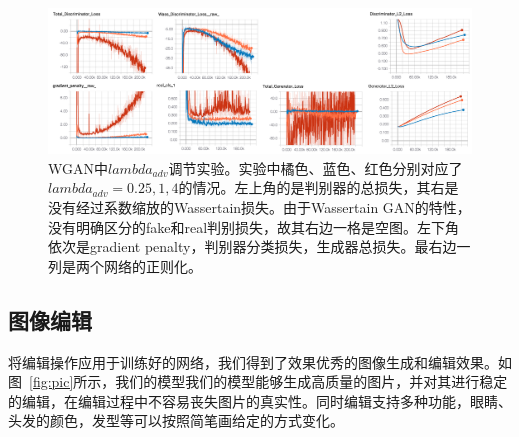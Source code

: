 \documentclass[a4paper,12pt,UTF8]{ctexart}
\newcommand{\kai}{\CJKfamily{zhkai}}	%
\begin{document}
\begin{figure}[H]
  \centering
  \includegraphics[width=1\linewidth]{figs/good_model_wgan.png}
  \caption{\kai WGAN中$lambda_{adv}$调节实验。实验中橘色、蓝色、红色分别对应了$lambda_{adv}=0.25, 1, 4$的情况。左上角的是判别器的总损失，其右是没有经过系数缩放的Wassertain损失。由于Wassertain GAN的特性，没有明确区分的fake和real判别损失，故其右边一格是空图。左下角依次是gradient penalty，判别器分类损失，生成器总损失。最右边一列是两个网络的正则化。}
  \label{fig:goodmodel_dragan}
\end{figure}






\subsection{图像编辑}

%

将编辑操作应用于训练好的网络，我们得到了效果优秀的图像生成和编辑效果。如图~\ref{fig:pic}所示，我们的模型我们的模型能够生成高质量的图片，并对其进行稳定的编辑，在编辑过程中不容易丧失图片的真实性。同时编辑支持多种功能，眼睛、头发的颜色，发型等可以按照简笔画给定的方式变化。
\end{document}
